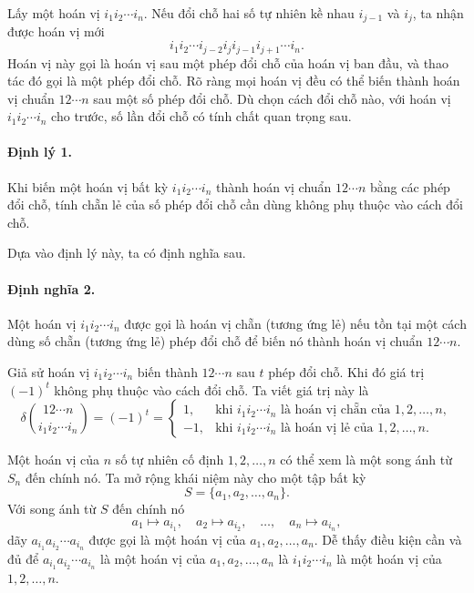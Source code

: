 \documentclass[11pt]{article}
\begin{document}
Lấy một hoán vị \(i_1i_2\cdots i_n\). Nếu đổi chỗ hai số tự nhiên kề nhau
\(i_{j-1}\) và \(i_j\), ta nhận được hoán vị mới
\[
  i_1i_2\cdots i_{j-2}i_ji_{j-1}i_{j+1}\cdots i_n.
\]
Hoán vị này gọi là hoán vị sau một phép đổi chỗ của hoán vị ban đầu, và thao
tác đó gọi là một phép đổi chỗ. Rõ ràng mọi hoán vị đều có thể biến thành hoán
vị chuẩn \(12\cdots n\) sau một số phép đổi chỗ. Dù chọn cách đổi chỗ nào, với
hoán vị \(i_1i_2\cdots i_n\) cho trước, số lần đổi chỗ có tính chất quan trọng
sau.

\paragraph{Định lý 1.}
Khi biến một hoán vị bất kỳ \(i_1i_2\cdots i_n\) thành hoán vị chuẩn
\(12\cdots n\) bằng các phép đổi chỗ, tính chẵn lẻ của số phép đổi chỗ cần dùng
không phụ thuộc vào cách đổi chỗ.

Dựa vào định lý này, ta có định nghĩa sau.

\paragraph{Định nghĩa 2.}
Một hoán vị \(i_1i_2\cdots i_n\) được gọi là hoán vị chẵn (tương ứng lẻ) nếu
tồn tại một cách dùng số chẵn (tương ứng lẻ) phép đổi chỗ để biến nó thành
hoán vị chuẩn \(12\cdots n\).

Giả sử hoán vị \(i_1i_2\cdots i_n\) biến thành \(12\cdots n\) sau \(t\) phép đổi
chỗ. Khi đó giá trị \((-1)^t\) không phụ thuộc vào cách đổi chỗ. Ta viết giá
trị này là
\[
  \delta\!\binom{12\cdots n}{i_1i_2\cdots i_n}=(-1)^t
  =
  \begin{cases}
    1, & \text{khi } i_1i_2\cdots i_n
          \text{ là hoán vị chẵn của } 1,2,\ldots,n,\\
   -1, & \text{khi } i_1i_2\cdots i_n
          \text{ là hoán vị lẻ của } 1,2,\ldots,n.
  \end{cases}
\]

Một hoán vị của \(n\) số tự nhiên cố định \(1,2,\ldots,n\) có thể xem là một
song ánh từ \(S_n\) đến chính nó. Ta mở rộng khái niệm này cho một tập bất kỳ
\[
  S=\{a_1,a_2,\ldots,a_n\}.
\]
Với song ánh từ \(S\) đến chính nó
\[
  a_1\mapsto a_{i_1},\quad a_2\mapsto a_{i_2},\quad \ldots,\quad
  a_n\mapsto a_{i_n},
\]
dãy \(a_{i_1}a_{i_2}\cdots a_{i_n}\) được gọi là một hoán vị của
\(a_1,a_2,\ldots,a_n\). Dễ thấy điều kiện cần và đủ để
\(a_{i_1}a_{i_2}\cdots a_{i_n}\) là một hoán vị của
\(a_1,a_2,\ldots,a_n\) là \(i_1i_2\cdots i_n\) là một hoán vị của
\(1,2,\ldots,n\).
\end{document}
